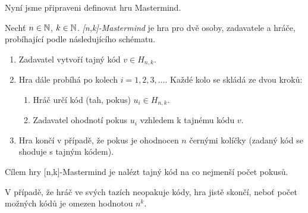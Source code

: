 
Nyní jsme připraveni definovat hru Mastermind. 

\begin{definice}[{[n,k]-Mastermind}]
    Nechť $n \in \mathbb{N} $, $k \in \mathbb{N}$. \emph{[n,k]-Mastermind} je hra pro dvě osoby, zadavatele a hráče, 
    probíhající podle následujícího schématu. 
    \begin{enumerate}
        \item Zadavatel vytvoří tajný kód $v \in H_{n,k}$.
        \item Hra dále probíhá po kolech $i = 1,2,3,\dots$. Každé kolo se skládá ze dvou kroků:
            \begin{enumerate}
                \item Hráč určí kód (tah, pokus) $u_i \in H_{n,k}$.
                \item Zadavatel ohodnotí pokus $u_i$ vzhledem k tajnému kódu $v$. 
            \end{enumerate}
        \item Hra končí v případě, že pokus je ohodnocen $n$ černými kolíčky (zadaný kód se shoduje s tajným kódem). 
    \end{enumerate}
    Cílem hry [n,k]-Mastermind je nalézt tajný kód na co nejmenší počet pokusů.
\end{definice}
\begin{pozn}
     V případě, že hráč ve svých tazích neopakuje kódy, hra jistě skončí, neboť počet možných kódů je omezen hodnotou $n^k$.
\end{pozn}





